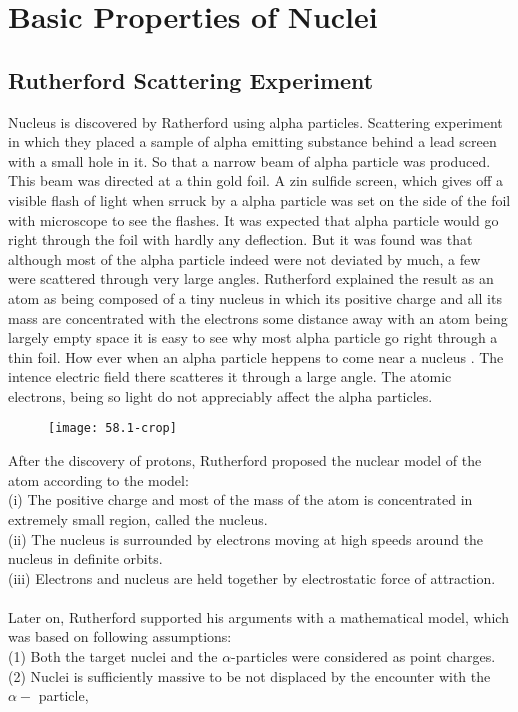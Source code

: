 \chapter{Basic Properties of Nuclei}
\section{Rutherford Scattering Experiment}
Nucleus is discovered by Ratherford using alpha particles. Scattering experiment in which they placed a sample of alpha emitting substance behind a lead screen with a small hole in it. So that a narrow beam of alpha particle was produced. This beam was directed at a thin gold foil. A zin sulfide screen, which gives off a visible flash of light when srruck by a alpha particle was set on the side of the foil with microscope to see the flashes. It was expected that alpha particle would go right through the foil with hardly any deflection. But it was found was that although most of the alpha particle indeed were not deviated by much, a few were scattered through very large angles. Rutherford explained the result as an atom as being composed of a tiny nucleus in which its positive charge and all its mass are concentrated with the electrons some distance away with an atom being largely empty space it is easy to see why most alpha particle go right through a thin foil. How ever when an alpha particle heppens to come near a nucleus . The intence electric field there scatteres it through a large angle. The atomic electrons, being so light do not appreciably affect the alpha particles.\\

	\begin{figure}[H]
		\centering
		\texttt{[image: 58.1-crop]}
	\end{figure}
After the discovery of protons, Rutherford proposed the nuclear model of the atom according to the model:\\
(i) The positive charge and most of the mass of the atom is concentrated in extremely small region, called the nucleus.\\
(ii) The nucleus is surrounded by electrons moving at high speeds around the nucleus in definite orbits.\\
(iii) Electrons and nucleus are held together by electrostatic force of attraction.\\\\
Later on, Rutherford supported his arguments with a mathematical model, which was based on following assumptions:\\
(1) Both the target nuclei and the $\alpha$-particles were considered as point charges.\\
(2) Nuclei is sufficiently massive to be not displaced by the encounter with the $\alpha-$ particle,\\
